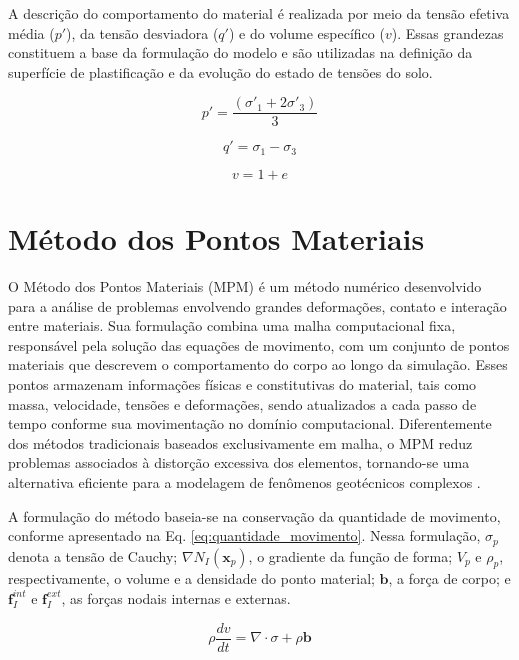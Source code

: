 A descrição do comportamento do material é realizada por meio da tensão efetiva média ($p'$), da tensão desviadora ($q'$) e do volume específico ($v$). Essas grandezas constituem a base da formulação do modelo e são utilizadas na definição da superfície de plastificação e da evolução do estado de tensões do solo.

\begin{equation}
	p'=\frac{(\sigma'_1 +2\sigma'_3)}{3}
	\label{eq:t_efetiva_cc}
\end{equation}

\begin{equation}
	q'=\sigma_1 - \sigma_3
	\label{eq:t_desviadora_cc}
\end{equation}

\begin{equation}
	v=1+e
	\label{eq:volume_cc}
\end{equation}

\section{Método dos Pontos Materiais}

O Método dos Pontos Materiais (MPM) é um método numérico desenvolvido para a análise de problemas envolvendo grandes deformações, contato e interação entre materiais. Sua formulação combina uma malha computacional fixa, responsável pela solução das equações de movimento, com um conjunto de pontos materiais que descrevem o comportamento do corpo ao longo da simulação. Esses pontos armazenam informações físicas e constitutivas do material, tais como massa, velocidade, tensões e deformações, sendo atualizados a cada passo de tempo conforme sua movimentação no domínio computacional. Diferentemente dos métodos tradicionais baseados exclusivamente em malha, o MPM reduz problemas associados à distorção excessiva dos elementos, tornando-se uma alternativa eficiente para a modelagem de fenômenos geotécnicos complexos \cite{Yerro2022,nguyen2023}. 

A formulação do método baseia-se na conservação da quantidade de movimento, conforme apresentado na Eq. \eqref{eq:quantidade_movimento}.  Nessa formulação, $\sigma_p$ denota a tensão de Cauchy; $\nabla N_I(\mathbf{x}_p)$, o gradiente da função de forma; $V_p$ e $\rho_p$, respectivamente, o volume e a densidade do ponto material; $\mathbf{b}$, a força de corpo; e $\mathbf{f}_I^{int}$ e $\mathbf{f}_I^{ext}$, as forças nodais internas e externas.

\begin{equation}
	\rho \frac{dv}{dt} = \nabla \cdot \sigma + \rho \mathbf{b}
	\label{eq:quantidade_movimento}
\end{equation}

